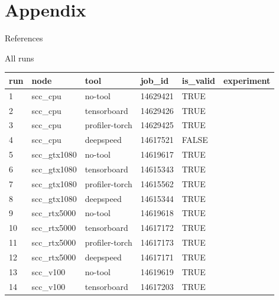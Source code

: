 \documentclass[compress,aspectratio=169]{beamer}
\begin{document}
\section{Appendix}

\begin{frame}{References}
    \renewcommand*{\bibfont}{\normalfont\scriptsize}
    \printbibliography[heading=none]
\end{frame}

\begin{frame}{All runs}
\tiny{
\begin{table}[]
\begin{tabular}{@{}llllll@{}}
\toprule
run & node         & tool           & job\_id  & is\_valid & experiment     \\ \midrule
1   & scc\_cpu     & no-tool        & 14629421 & TRUE      &                \\
2   & scc\_cpu     & tensorboard    & 14629426 & TRUE      &                \\
3   & scc\_cpu     & profiler-torch & 14629425 & TRUE      &                \\
4   & scc\_cpu     & deepspeed      & 14617521 & FALSE     &                \\
5   & scc\_gtx1080 & no-tool        & 14619617 & TRUE      &                \\
6   & scc\_gtx1080 & tensorboard    & 14615343 & TRUE      &                \\
7   & scc\_gtx1080 & profiler-torch & 14615562 & TRUE      &                \\
8   & scc\_gtx1080 & deepspeed      & 14615344 & TRUE      &                \\
9   & scc\_rtx5000 & no-tool        & 14619618 & TRUE      &                \\
10  & scc\_rtx5000 & tensorboard    & 14617172 & TRUE      &                \\
11  & scc\_rtx5000 & profiler-torch & 14617173 & TRUE      &                \\
12  & scc\_rtx5000 & deepspeed      & 14617171 & TRUE      &                \\
13  & scc\_v100    & no-tool        & 14619619 & TRUE      &                \\
14  & scc\_v100    & tensorboard    & 14617203 & TRUE      &                \\

\end{tabular}
\end{table}}
\end{frame}
\end{document}
